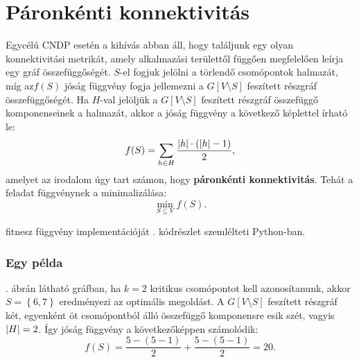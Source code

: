 \section{Páronkénti konnektivitás}\label{sec:PAIRWISE_CONNECTIVITY}
Egycélú CNDP esetén a kihívás abban áll, hogy találjunk egy olyan konnektivitási metrikát,
amely alkalmazási területtől függően megfelelően leírja egy gráf összefüggőségét.
$S$-el fogjuk jelölni a törlendő csomópontok halmazát,
míg az$f(S)$ jóság függvény fogja jellemezni a $G[V \setminus S]$ feszített részgráf összefüggőségét.
Ha $H$-val jelöljük a $G[V \setminus S]$ feszített részgráf összefüggő komponenseinek a halmazát,
akkor a jóság függvény a következő képlettel írható le:
\begin{equation}\label{eqn:PAIRWISE_CONNECTIVITY}
  f(S) = \sum_{h \in H} \frac{\lvert h\rvert \cdot (\lvert h\rvert - 1)}{2},
\end{equation}
amelyet az irodalom \cite{ventresca2012global, aringhieri2016general} úgy tart számon,
hogy \textbf{páronkénti konnektivitás}.
Tehát a feladat  függvénynek a minimalizálása:
\begin{equation}\label{eqn:MIN_PAIRWISE_CONNECTIVITY}
  \min_{S \subseteq V} f(S).
\end{equation}

 fitnesz függvény implementációját . kódrészlet szemlélteti Python-ban.



\subsubsection{Egy példa}
. ábrán látható gráfban,
ha $k = 2$ kritikus csomópontot kell azonosítanunk,
akkor $S = \left\{ 6, 7 \right\}$ eredményezi az optimális megoldást.
A $G\left[ V \setminus S \right]$ feszített részgráf két, egyenként öt csomópontból álló összefüggő komponensre esik szét,
vagyis $\lvert H\rvert = 2$. Így  jóság függvény a következőképpen számolódik:
\[
  f(S) = \dfrac{5 - (5 - 1)}{2} + \dfrac{5 - (5 - 1)}{2} = 20.
\]

